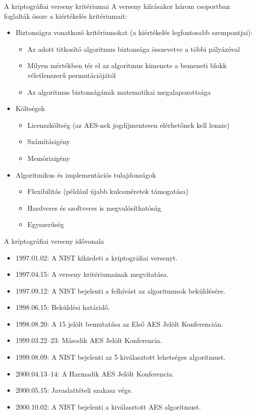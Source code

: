\documentclass[12 pt]{beamer}
\begin{document}
\begin{frame}{A kriptográfiai verseny kritériumai}
  A verseny kiírásakor három csoportban foglalták össze a kiértékelés kritériumait:
  \begin{itemize}
    \item{Biztonságra vonatkozó kritériumokat (a kiértékelés legfontosabb szempontjai):}
      \begin{itemize}
        \item{Az adott titkosító algoritmus biztonsága összevetve a többi pályázóval}
        \item{Milyen mértékben tér el az algoritmus kimenete a bemeneti blokk véletlenszerű permutációjától}
        \item{Az algoritmus biztonságának matematikai megalapozottsága}
      \end{itemize}
    \item{Költségek}
      \begin{itemize}
        \item{Licenszköltség (az AES-nek jogdíjmentesen elérhetőnek kell lennie)}
        \item{Számításigény}
        \item{Memóriaigény}
      \end{itemize}
    \item{Algoritmikus és implementációs tulajdonságok}
      \begin{itemize}
        \item{Flexibilitás (például újabb kulcsméretek támogatása)}
        \item{Hardveres és szoftveres is megvalósíthatóság}
        \item{Egyszerűség}
      \end{itemize}
  \end{itemize}
\end{frame}


\begin{frame}{A kriptográfiai verseny idővonala}
  \begin{itemize}
    \item{1997.01.02: A NIST kihirdeti a kriptográfiai versenyt.}
    \item{1997.04.15: A verseny kritériumainak megvitatása.}
    \item{1997.09.12: A NIST bejelenti a felhívást az algoritmusok beküldésére.}
    \item{1998.06.15: Beküldési határidő.}
    \item{1998.08.20: A 15 jelölt bemutatása az Első AES Jelölt Konferencián.}
    \item{1999.03.22–23: Második AES Jelölt Konferencia.}
    \item{1999.08.09: A NIST bejelenti az 5 kiválasztott lehetséges algoritmust.}
    \item{2000.04.13–14: A Harmadik AES Jelölt Konferencia.}
    \item{2000.05.15: Javaslattételi szakasz vége.}
    \item{2000.10.02: A NIST bejelenti a kiválasztott AES algoritmust.}
  \end{itemize}
\end{frame}
\end{document}
